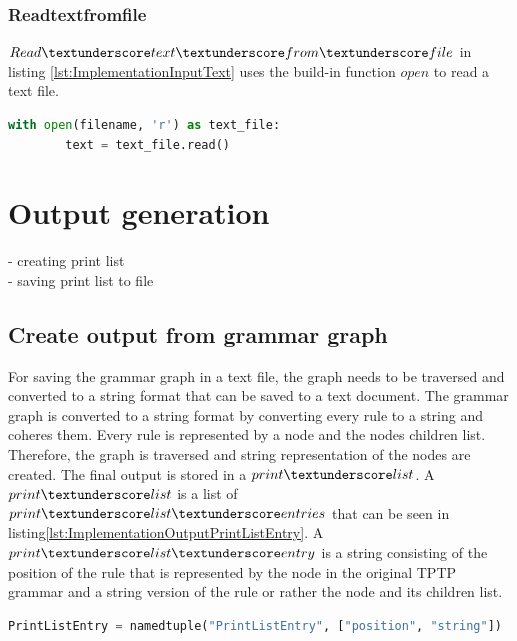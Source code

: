 \subsubsection{Read\textunderscore text\textunderscore from\textunderscore file}

$Read\textunderscore text\textunderscore from\textunderscore file$ in listing \ref{lst:ImplementationInputText} uses the build-in function $open$ to read a text file. \\

\begin{lstlisting}[language=Python, basicstyle=\scriptsize	,caption= Read text from file,label= lst:ImplementationInputText]
with open(filename, 'r') as text_file:
        text = text_file.read()
\end{lstlisting}

\section{Output generation}\label{sec:ImplementationOutputGeneration}

- creating print list\\ 
- saving print list to file

\subsection{Create output from grammar graph}\label{sec:ImplementationOutputGrammarGraph}

For saving the grammar graph in a text file, the graph needs to be traversed and converted to a string format that can be saved to a text document. The grammar graph is converted to a string format by converting every rule to a string and coheres them. Every rule is represented by a node and the nodes children list. Therefore, the graph is traversed and string representation of the nodes are created.
The final output is stored in a $print\textunderscore list$. A $print\textunderscore list$ is a list of $print\textunderscore list\textunderscore entries$ that can be seen in listing\ref{lst:ImplementationOutputPrintListEntry}. A $print\textunderscore list\textunderscore entry$ is a string consisting of the position of the rule that is represented by the node in the original \ac{TPTP} grammar and a string version of the rule or rather the node and its children list.

\begin{lstlisting}[language=Python, basicstyle=\scriptsize	,caption= Print List Entry,label= lst:ImplementationOutputPrintListEntry]
PrintListEntry = namedtuple("PrintListEntry", ["position", "string"])
\end{lstlisting}

